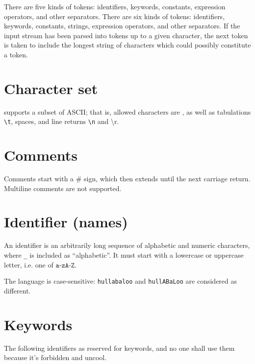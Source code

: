 There are five kinds of tokens: identifiers, keywords, constants, expression operators, and other separators. There are six kinds of tokens: identifiers, keywords, constants, strings, expression operators, and other separators. If the input stream has been parsed into tokens up to a given character, the next token is taken to include the longest string of characters which could possibly constitute a token.

\section{Character set}
\QL supports a subset of ASCII; that is, allowed characters are
, as well as tabulations \texttt{\textbackslash{}t}, spaces, and line returns \texttt{\textbackslash{}n} and {\textbackslash{}r}.
\section{Comments}
Comments start with a \# sign, which then extends until the next carriage return. Multiline comments are not supported.

\section{Identifier (names)}
An identifier is an arbitrarily long sequence of alphabetic and numeric characters, where \texttt{\_} is included as ``alphabetic''. It must start with a lowercase or uppercase letter, i.e. one of $\texttt{a-zA-Z}$.

\noindent The language is case-sensitive: \texttt{hullabaloo} and \texttt{hullABaLoo} are considered as different.

\section{Keywords}
The following identifiers as reserved for keywords, and no one shall use them because it's forbidden and uncool.

